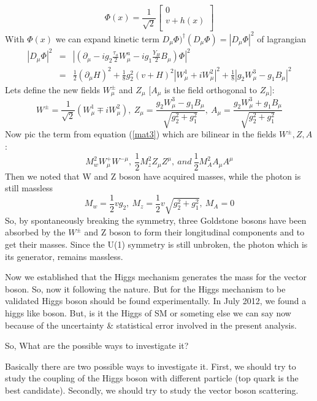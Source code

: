     \begin{equation}
    \Phi (x)=\frac{1}{\sqrt{2}}
        \begin{bmatrix}
        0   \\
        v+h(x)  \\
        \end{bmatrix}
    \end{equation}
With $\Phi(x)$ we can expand kinetic term $D_\mu \Phi)^{\dagger} (D_\mu \Phi)=|D_\mu \Phi|^2$ of lagrangian
    \begin{eqnarray}\label{mat3}
    |D_{\mu} \Phi|^2 & = & |(\partial_{\mu}-ig_2\frac{\tau_a}{2}W^a_{\mu}-ig_1 \frac{Y_H}{2}B_{\mu})\Phi|^2 \nonumber \\
            & = & \frac{1}{2}(\partial_\mu H)^2+\frac{1}{8}g^2_2(v+H)^2|W^1_{\mu}+iW^2_\mu|^2+\frac{1}{8}|g_2W^3_\mu-g_1B_\mu|^2
    \end{eqnarray}
Lets define the new fields $W^{\pm}_\mu$ and $Z_\mu$ [$A_\mu$ is the field orthogonal to $Z_\mu$]:
\begin{equation}
    W^{\pm}=\frac{1}{\sqrt{2}}(W^1_\mu \mp iW^2_\mu),~Z_\mu=\frac{g_2W^3_\mu-g_1B_\mu}{\sqrt{g^2_2+g^2_1}},~A_\mu=\frac{g_2W^3_\mu+g_1B_\mu}{\sqrt{g^2_2+g^2_1}}
\end{equation}
Now pic the term from equation (\ref{mat3}) which are bilinear in the fields $W^\pm,Z,A$:
    \begin{equation}
    M^2_wW^+_\mu W^{-\mu},~\frac{1}{2}M^2_z Z_\mu Z^\mu,~and~\frac{1}{2}M^2_AA_\mu A^\mu
    \end{equation}
Then we noted that W and Z boson have acquired masses, while the photon is still massless
    \begin{equation}
    M_w=\frac{1}{2}vg_2,~M_z=\frac{1}{2}v\sqrt{g^2_2+g^2_1},~M_A=0
    \end{equation}
So, by spontaneously breaking the symmetry, three Goldstone bosons have been absorbed by the $W^\pm$ and Z boson to form their longitudinal components and to get their masses. Since the U(1) symmetry is still unbroken, the photon which is its generator, remains massless.


Now we established that the Higgs mechanism generates the mass for the vector boson. So, now it following the nature. But for the Higgs mechanism to be validated Higgs boson should be found experimentally. In July 2012, we found a higgs like boson. But, is it the Higgs of SM or someting else we can say now because of the uncertainty \& statistical error involved in the present analysis. 

So, What are the possible ways to investigate it?

Basically there are two possible ways to investigate it. First, we should try to study the coupling of the Higgs boson with different particle (top quark is the best candidate). Secondly, we should try to study the vector boson scattering.

